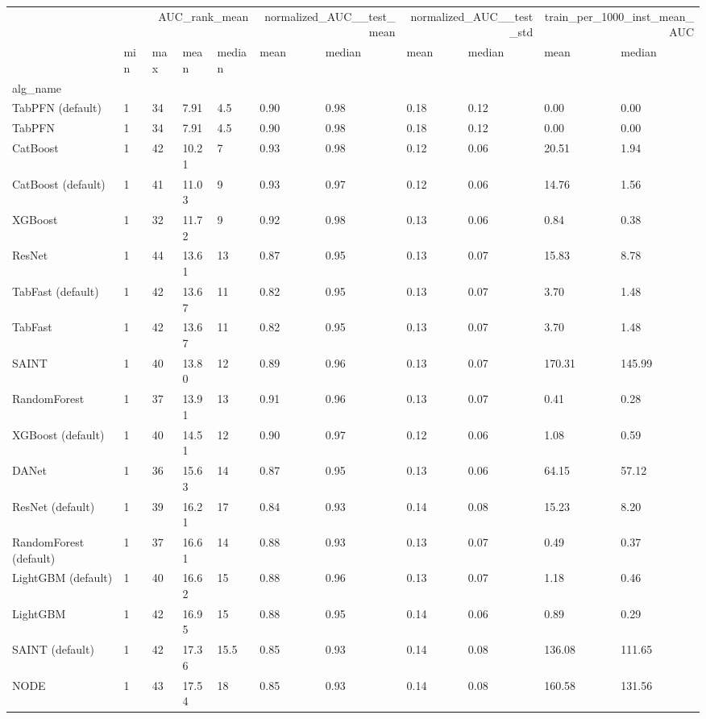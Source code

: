 \begin{tabular}{lllllllllll}
\toprule
 & \multicolumn{4}{r}{AUC_rank_mean} & \multicolumn{2}{r}{normalized_AUC__test_mean} & \multicolumn{2}{r}{normalized_AUC__test_std} & \multicolumn{2}{r}{train_per_1000_inst_mean_AUC} \\
 & min & max & mean & median & mean & median & mean & median & mean & median \\
alg_name &  &  &  &  &  &  &  &  &  &  \\
\midrule
TabPFN (default) & 1 & 34 & 7.91 & 4.5 & 0.90 & 0.98 & 0.18 & 0.12 & 0.00 & 0.00 \\
TabPFN & 1 & 34 & 7.91 & 4.5 & 0.90 & 0.98 & 0.18 & 0.12 & 0.00 & 0.00 \\
CatBoost & 1 & 42 & 10.21 & 7 & 0.93 & 0.98 & 0.12 & 0.06 & 20.51 & 1.94 \\
CatBoost (default) & 1 & 41 & 11.03 & 9 & 0.93 & 0.97 & 0.12 & 0.06 & 14.76 & 1.56 \\
XGBoost & 1 & 32 & 11.72 & 9 & 0.92 & 0.98 & 0.13 & 0.06 & 0.84 & 0.38 \\
ResNet & 1 & 44 & 13.61 & 13 & 0.87 & 0.95 & 0.13 & 0.07 & 15.83 & 8.78 \\
TabFast (default) & 1 & 42 & 13.67 & 11 & 0.82 & 0.95 & 0.13 & 0.07 & 3.70 & 1.48 \\
TabFast & 1 & 42 & 13.67 & 11 & 0.82 & 0.95 & 0.13 & 0.07 & 3.70 & 1.48 \\
SAINT & 1 & 40 & 13.80 & 12 & 0.89 & 0.96 & 0.13 & 0.07 & 170.31 & 145.99 \\
RandomForest & 1 & 37 & 13.91 & 13 & 0.91 & 0.96 & 0.13 & 0.07 & 0.41 & 0.28 \\
XGBoost (default) & 1 & 40 & 14.51 & 12 & 0.90 & 0.97 & 0.12 & 0.06 & 1.08 & 0.59 \\
DANet & 1 & 36 & 15.63 & 14 & 0.87 & 0.95 & 0.13 & 0.06 & 64.15 & 57.12 \\
ResNet (default) & 1 & 39 & 16.21 & 17 & 0.84 & 0.93 & 0.14 & 0.08 & 15.23 & 8.20 \\
RandomForest (default) & 1 & 37 & 16.61 & 14 & 0.88 & 0.93 & 0.13 & 0.07 & 0.49 & 0.37 \\
LightGBM (default) & 1 & 40 & 16.62 & 15 & 0.88 & 0.96 & 0.13 & 0.07 & 1.18 & 0.46 \\
LightGBM & 1 & 42 & 16.95 & 15 & 0.88 & 0.95 & 0.14 & 0.06 & 0.89 & 0.29 \\
SAINT (default) & 1 & 42 & 17.36 & 15.5 & 0.85 & 0.93 & 0.14 & 0.08 & 136.08 & 111.65 \\
NODE & 1 & 43 & 17.54 & 18 & 0.85 & 0.93 & 0.14 & 0.08 & 160.58 & 131.56 \\

\end{tabular}
